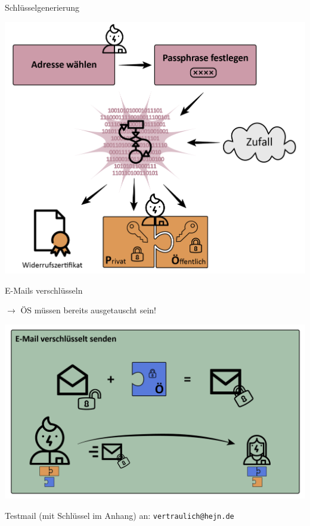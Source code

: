 \documentclass{beamer}
\begin{document}
\begin{frame}{Schlüsselgenerierung}
  \begin{center}
  \includegraphics[width=.8\textwidth]{img-src/pgp_keygen.png}
  \end{center}
\end{frame}


\begin{frame}{E-Mails verschlüsseln}
  
  $\rightarrow$ ÖS müssen bereits ausgetauscht sein!

  \begin{center}
  \includegraphics[width=.9\textwidth]{img-src/pgp_enc.png}
  \end{center}

  Testmail (mit Schlüssel im Anhang) an: \texttt{vertraulich@hejn.de}

\end{frame}
\end{document}

